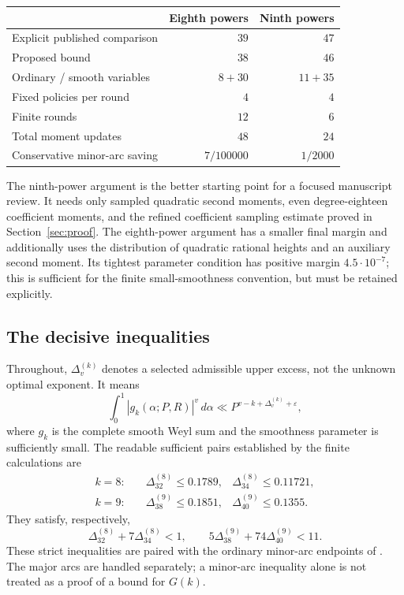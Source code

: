 \documentclass[11pt,letterpaper]{article}
\numberwithin{equation}{section}
\begin{document}
\begin{center}
\small
\begin{tabular}{lrr}
\toprule
 & Eighth powers & Ninth powers\\
\midrule
Explicit published comparison & $39$ & $47$\\
Proposed bound & $38$ & $46$\\
Ordinary / smooth variables & $8+30$ & $11+35$\\
Fixed policies per round & $4$ & $4$\\
Finite rounds & $12$ & $6$\\
Total moment updates & $48$ & $24$\\
Conservative minor-arc saving & $7/100000$ & $1/2000$\\
\bottomrule
\end{tabular}
\end{center}

The ninth-power argument is the better starting point for a focused
manuscript review. It needs only sampled quadratic second moments, even
degree-eighteen coefficient moments, and the refined coefficient sampling
estimate proved in Section~\ref{sec:proof}. The eighth-power argument has
a smaller final margin and additionally uses the distribution of quadratic
rational heights and an auxiliary second moment. Its tightest parameter
condition has positive margin $4.5\cdot10^{-7}$; this is sufficient for
the finite small-smoothness convention, but must be retained explicitly.

\subsection{The decisive inequalities}

Throughout, $\Delta_v^{(k)}$ denotes a selected admissible upper excess,
not the unknown optimal exponent. It means
\[
 \int_0^1|g_k(\alpha;P,R)|^v\,d\alpha
          \ll P^{v-k+\Delta_v^{(k)}+\varepsilon},
\]
where $g_k$ is the complete smooth Weyl sum and the smoothness parameter is
sufficiently small. The readable sufficient pairs established by the
finite calculations are
\begin{align*}
 k=8:&\quad \Delta_{32}^{(8)}\le0.1789,
                  &\Delta_{34}^{(8)}\le0.11721,\\
 k=9:&\quad \Delta_{38}^{(9)}\le0.1851,
                  &\Delta_{40}^{(9)}\le0.1355.
\end{align*}
They satisfy, respectively,
\[
 \Delta_{32}^{(8)}+7\Delta_{34}^{(8)}<1,
 \qquad
 5\Delta_{38}^{(9)}+74\Delta_{40}^{(9)}<11.
\]
These strict inequalities are paired with the ordinary minor-arc endpoints
of \cite[Lemma~3.1]{W16}. The major arcs are handled separately; a minor-arc
inequality alone is not treated as a proof of a bound for $G(k)$.
\end{document}

